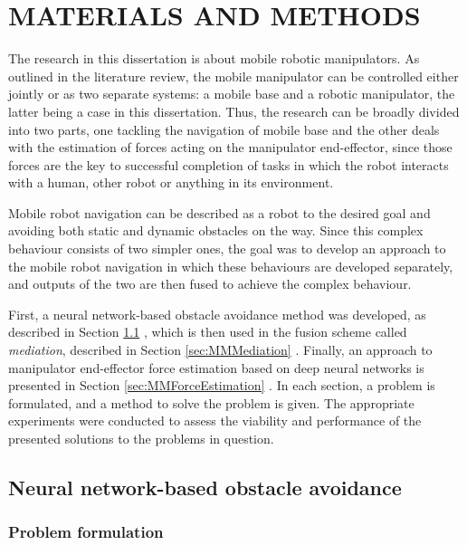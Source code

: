 \chapter{MATERIALS AND METHODS}
\label{chap:Materials}

The research in this dissertation is about mobile robotic manipulators. As outlined in the literature review, the mobile manipulator can be controlled either jointly or as two separate systems: a mobile base and a robotic manipulator, the latter being a case in this dissertation. Thus, the research can be broadly divided into two parts, one tackling the navigation of mobile base and the other deals with the estimation of forces acting on the manipulator end-effector, since those forces are the key to successful completion of tasks in which the robot interacts with a human, other robot or anything in its environment. 

Mobile robot navigation can be described as a robot to the desired goal and avoiding both static and dynamic obstacles on the way. Since this complex behaviour consists of two simpler ones, the goal was to develop an approach to the mobile robot navigation in which these behaviours are developed separately, and outputs of the two are then fused to achieve the complex behaviour.

First, a neural network-based obstacle avoidance method was developed, as described in Section \ref{sec:MMAvoidance} \cite{Kruzic2020}, which is then used in the fusion scheme called \emph{mediation}, described in Section \ref{sec:MMMediation} \cite{Music2019}. Finally, an approach to manipulator end-effector force estimation based on deep neural networks is presented in Section \ref{sec:MMForceEstimation} \cite{Kruzic2020a}. In each section, a problem is formulated, and a method to solve the problem is given. The appropriate experiments were conducted to assess the viability and performance of the presented solutions to the problems in question.


\section{Neural network-based obstacle avoidance}
\label{sec:MMAvoidance}

\subsection{Problem formulation}

